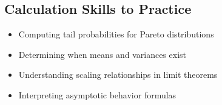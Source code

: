 \documentclass[11pt]{article}
\begin{document}
\subsection*{Calculation Skills to Practice}
\begin{itemize}
    \item Computing tail probabilities for Pareto distributions
    \item Determining when means and variances exist
    \item Understanding scaling relationships in limit theorems
    \item Interpreting asymptotic behavior formulas
\end{itemize}
\end{document}
